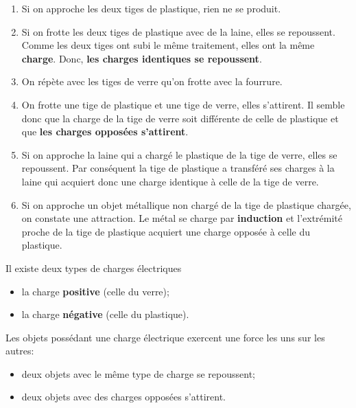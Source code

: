 \begin{enumerate}
  \item Si on approche les deux tiges de plastique, rien ne se produit.
  \item Si on frotte les deux tiges de plastique avec de la laine, elles se
    repoussent. Comme les deux tiges ont subi le même traitement, elles ont la
    même \textbf{charge}. Donc, \textbf{les charges identiques se repoussent}.
  \item On répète avec les tiges de verre qu'on frotte avec la fourrure.
  \item On frotte une tige de plastique et une tige de verre, elles s'attirent.
    Il semble donc que la charge de la tige de verre soit différente de celle
    de plastique et que \textbf{les charges opposées s'attirent}.
  \item Si on approche la laine qui a chargé le plastique de la tige de verre,
    elles se repoussent. Par conséquent la tige de plastique a transféré ses
    charges à la laine qui acquiert donc une charge identique à celle de la
    tige de verre.
  \item Si on approche un objet métallique non chargé de la tige de plastique
    chargée, on constate une attraction. Le métal se charge par
    \textbf{induction} et l'extrémité proche de la tige de plastique acquiert
    une charge opposée à celle du plastique.
\end{enumerate}


\vspace{2mm}

\begin{fondamentalbox}
  Il existe deux types de charges électriques
  \begin{itemize}
    \item la charge \textbf{positive} (celle du verre);
    \item la charge \textbf{négative} (celle du plastique).
  \end{itemize}

  Les objets possédant une charge électrique exercent une force les uns sur les
  autres:
  \begin{itemize}
    \item deux objets avec le même type de charge se repoussent;
    \item deux objets avec des charges opposées s'attirent.
  \end{itemize}
\end{fondamentalbox}

